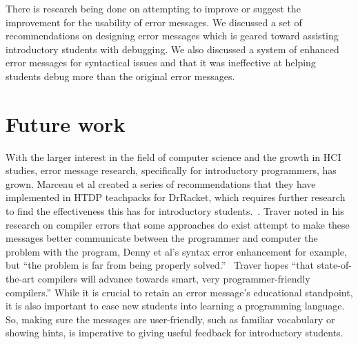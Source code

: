 \documentclass{sig-alternate}
\begin{document}
There is research being done on attempting to improve or suggest the improvement for the usability of error messages.
We discussed a set of recommendations on designing error messages which is geared toward assisting introductory students with debugging.
We also discussed a system of enhanced error messages for syntactical issues and that it was ineffective at helping students debug more than the original error messages.

\section{Future work}\label{sec:ftrwrk}

With the larger interest in the field of computer science and the growth in HCI studies, error message research, specifically for introductory programmers, has grown.
Marceau et al created a series of recommendations that they have implemented in HTDP teachpacks for DrRacket, which requires further research to find the effectiveness this has for introductory students.~\cite{htdp-teachpacks}.
Traver noted in his research on compiler errors that some approaches do exist attempt to make these messages better communicate between the programmer and computer the problem with the program, Denny et al's syntax error enhancement for example, but ``the problem is far from being properly solved.''~\cite{Traver:2010}  
Traver hopes ``that state-of-the-art compilers will advance towards smart, very programmer-friendly compilers.''
While it is crucial to retain an error message's educational standpoint, it is also important to ease new students into learning a programming language.
So, making sure the messages are user-friendly, such as familiar vocabulary or showing hints, is imperative to giving useful feedback for introductory students.



  

\end{document}
